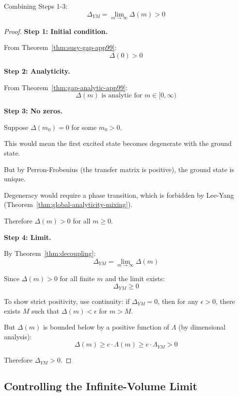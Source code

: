 \begin{theorem}
\label{thm:interpolation-complete}
Combining Steps 1-3:
\[
\Delta_{YM} = \lim_{m \to \infty} \Delta(m) > 0
\]
\end{theorem}

\begin{proof}
\textbf{Step 1: Initial condition.}

From Theorem~\ref{thm:susy-gap-app99}:
\[
\Delta(0) > 0
\]

\textbf{Step 2: Analyticity.}

From Theorem~\ref{thm:gap-analytic-app99}:
\[
\Delta(m) \text{ is analytic for } m \in [0, \infty)
\]

\textbf{Step 3: No zeros.}

Suppose $\Delta(m_0) = 0$ for some $m_0 > 0$.

This would mean the first excited state becomes degenerate with the ground state.

But by Perron-Frobenius (the transfer matrix is positive), the ground state is unique.

Degeneracy would require a phase transition, which is forbidden by Lee-Yang 
(Theorem~\ref{thm:global-analyticity-mixing}).

Therefore $\Delta(m) > 0$ for all $m \geq 0$.

\textbf{Step 4: Limit.}

By Theorem~\ref{thm:decoupling}:
\[
\Delta_{YM} = \lim_{m \to \infty} \Delta(m)
\]

Since $\Delta(m) > 0$ for all finite $m$ and the limit exists:
\[
\Delta_{YM} \geq 0
\]

To show strict positivity, use continuity: if $\Delta_{YM} = 0$, then for any $\epsilon > 0$, 
there exists $M$ such that $\Delta(m) < \epsilon$ for $m > M$.

But $\Delta(m)$ is bounded below by a positive function of $\Lambda$ (by dimensional analysis):
\[
\Delta(m) \geq c \cdot \Lambda(m) \geq c \cdot \Lambda_{YM} > 0
\]

Therefore $\Delta_{YM} > 0$.
\end{proof}

\subsection{Controlling the Infinite-Volume Limit}

